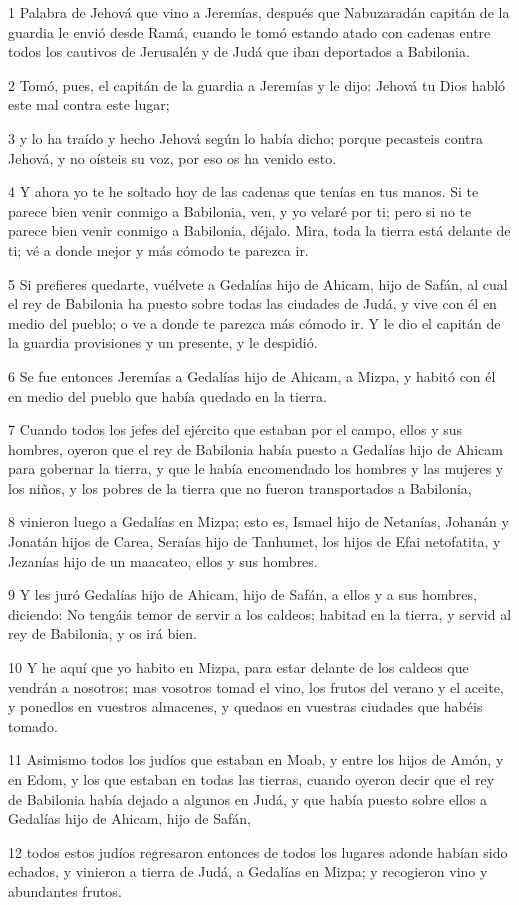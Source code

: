 \par 1 Palabra de Jehová que vino a Jeremías, después que Nabuzaradán capitán de la guardia le envió desde Ramá, cuando le tomó estando atado con cadenas entre todos los cautivos de Jerusalén y de Judá que iban deportados a Babilonia.
\par 2 Tomó, pues, el capitán de la guardia a Jeremías y le dijo: Jehová tu Dios habló este mal contra este lugar;
\par 3 y lo ha traído y hecho Jehová según lo había dicho; porque pecasteis contra Jehová, y no oísteis su voz, por eso os ha venido esto.
\par 4 Y ahora yo te he soltado hoy de las cadenas que tenías en tus manos. Si te parece bien venir conmigo a Babilonia, ven, y yo velaré por ti; pero si no te parece bien venir conmigo a Babilonia, déjalo. Mira, toda la tierra está delante de ti; vé a donde mejor y más cómodo te parezca ir.
\par 5 Si prefieres quedarte, vuélvete a Gedalías hijo de Ahicam, hijo de Safán, al cual el rey de Babilonia ha puesto sobre todas las ciudades de Judá, y vive con él en medio del pueblo; o ve a donde te parezca más cómodo ir. Y le dio el capitán de la guardia provisiones y un presente, y le despidió.
\par 6 Se fue entonces Jeremías a Gedalías hijo de Ahicam, a Mizpa, y habitó con él en medio del pueblo que había quedado en la tierra.
\par 7 Cuando todos los jefes del ejército que estaban por el campo, ellos y sus hombres, oyeron que el rey de Babilonia había puesto a Gedalías hijo de Ahicam para gobernar la tierra, y que le había encomendado los hombres y las mujeres y los niños, y los pobres de la tierra que no fueron transportados a Babilonia,
\par 8 vinieron luego a Gedalías en Mizpa; esto es, Ismael hijo de Netanías, Johanán y Jonatán hijos de Carea, Seraías hijo de Tanhumet, los hijos de Efai netofatita, y Jezanías hijo de un maacateo, ellos y sus hombres.
\par 9 Y les juró Gedalías hijo de Ahicam, hijo de Safán, a ellos y a sus hombres, diciendo: No tengáis temor de servir a los caldeos; habitad en la tierra, y servid al rey de Babilonia, y os irá bien. 
\par 10 Y he aquí que yo habito en Mizpa, para estar delante de los caldeos que vendrán a nosotros; mas vosotros tomad el vino, los frutos del verano y el aceite, y ponedlos en vuestros almacenes, y quedaos en vuestras ciudades que habéis tomado.
\par 11 Asimismo todos los judíos que estaban en Moab, y entre los hijos de Amón, y en Edom, y los que estaban en todas las tierras, cuando oyeron decir que el rey de Babilonia había dejado a algunos en Judá, y que había puesto sobre ellos a Gedalías hijo de Ahicam, hijo de Safán,
\par 12 todos estos judíos regresaron entonces de todos los lugares adonde habían sido echados, y vinieron a tierra de Judá, a Gedalías en Mizpa; y recogieron vino y abundantes frutos.

